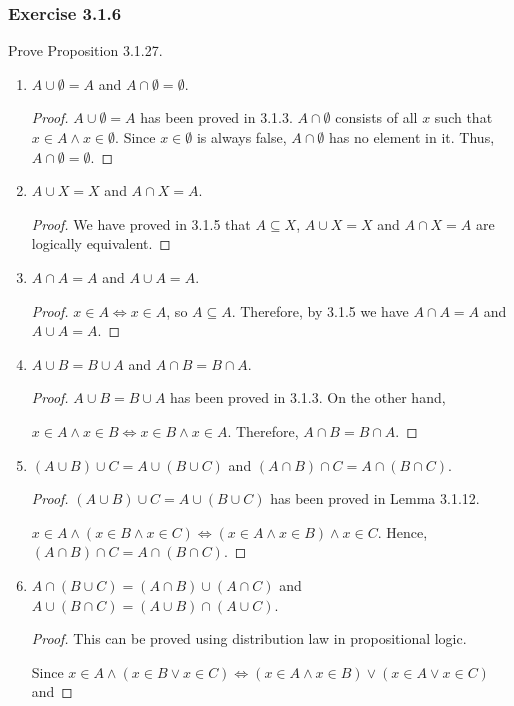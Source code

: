 \documentclass[12pt, letter]{article}
\begin{document}
\subsubsection*{Exercise 3.1.6}
Prove Proposition 3.1.27.
\begin{enumerate}
    \item $A\cup\emptyset=A$ and $A\cap\emptyset=\emptyset$.
    \begin{proof}
        $A\cup\emptyset=A$ has been proved in 3.1.3. $A\cap\emptyset$ consists of all $x$ such that $x\in A\land x\in\emptyset$. Since $x\in\emptyset$ is always false, $A\cap\emptyset$ has no element in it. Thus, $A\cap\emptyset=\emptyset$.
    \end{proof}
    \item $A\cup X=X$ and $A\cap X=A$.
    \begin{proof}
        We have proved in 3.1.5 that $A\subseteq X$, $A\cup X=X$ and $A\cap X=A$ are logically equivalent.
    \end{proof}
    \item $A\cap A=A$ and $A\cup A=A$.
    \begin{proof}
        $x\in A\iff x\in A$, so $A\subseteq A$. Therefore, by 3.1.5 we have $A\cap A=A$ and $A\cup A=A$.
    \end{proof}
    \item $A\cup B=B\cup A$ and $A\cap B=B\cap A$.
    \begin{proof}
        $A\cup B=B\cup A$ has been proved in 3.1.3. On the other hand, 
        
        $x\in A\land x\in B\iff x\in B\land x\in A$. Therefore, $A\cap B=B\cap A$.
    \end{proof} 
    \item $(A\cup B)\cup C=A\cup(B\cup C)$ and $(A\cap B)\cap C=A\cap(B\cap C)$.
    \begin{proof}
        $(A\cup B)\cup C=A\cup(B\cup C)$ has been proved in Lemma 3.1.12. 
        
        $x\in A\land(x\in B\land x\in C)\iff (x\in A\land x\in B)\land x\in C$. Hence, $(A\cap B)\cap C=A\cap(B\cap C)$.
    \end{proof}
    \item $A\cap(B\cup C)=(A\cap B)\cup(A\cap C)$ and $A\cup(B\cap C)=(A\cup B)\cap(A\cup C)$.
    \begin{proof}
        This can be proved using distribution law in propositional logic. 

        Since $x\in A\land(x\in B\lor x\in C)\iff(x\in A\land x\in B)\lor (x\in A\lor x\in C)$ and 


\end{proof}
\end{enumerate}
\end{document}

